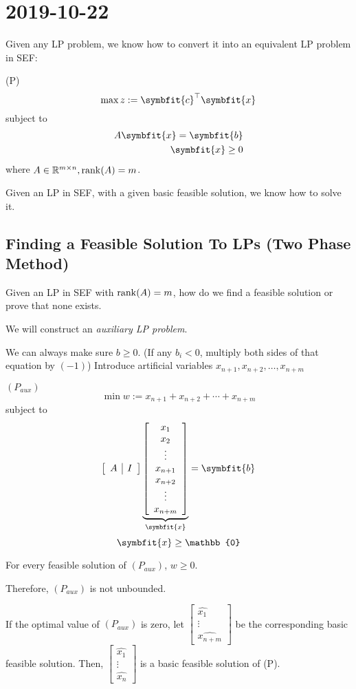 \section{2019-10-22}
Given any LP problem, we know how to convert it into an equivalent LP
problem in SEF:

(P)
\[\max z:=\symbfit{c}^\top \symbfit{x}\]
subject to
\begin{align*}
    A \symbfit{x}=\symbfit{b}\\
    \symbfit{x}\ge 0
\end{align*}
where $ A\in\mathbb{R}^{m\times n}, \operatorname{rank}(A)=m $.

Given an LP in SEF, with a given basic feasible solution, we know
how to solve it.

\subsection{Finding a Feasible Solution To LPs (Two Phase Method)}
Given an LP in SEF with $ \operatorname{rank}(A)=m $, how do we find a feasible
solution or prove that none exists.

We will construct an \emph{auxiliary LP problem}.

We can always make sure $ b\ge 0 $. (If any $ b_i<0 $, multiply both
sides of that equation by $ (-1) $) Introduce artificial variables
$ x_{n+1},x_{n+2},\ldots,x_{n+m} $

$ (P_{aux}) $
\[ \min w:=x_{n+1}+x_{n+2}+\cdots+x_{n+m} \]
subject to
\[
    \left[\begin{array}{c|c}
        A & I
    \end{array}\right]
    \underbrace{\left[\begin{array}{c}
        x_1\\
        x_2\\
        \vdots\\
        x_{n+1}\\
        x_{n+2}\\
        \vdots\\
        x_{n+m}
    \end{array}\right]}_{\symbfit{x}}
    =\symbfit{b}\]
\[ \symbfit{x} \ge \mathbb{0}\]

For every feasible solution of $ (P_{aux}) $, $ w\ge 0 $.

Therefore, $ (P_{aux}) $ is not unbounded.

If the optimal value of $ (P_{aux}) $ is zero, let
$ 
\begin{bmatrix}
    \hat{x_1}\\
    \vdots\\
    \hat{x_{n+m}}
\end{bmatrix}
$ 
be the corresponding basic feasible solution. Then, 
$ 
\begin{bmatrix}
    \hat{x_1}\\
    \vdots\\
    \hat{x_{n}}
\end{bmatrix}
$
is a basic feasible solution of (P).


